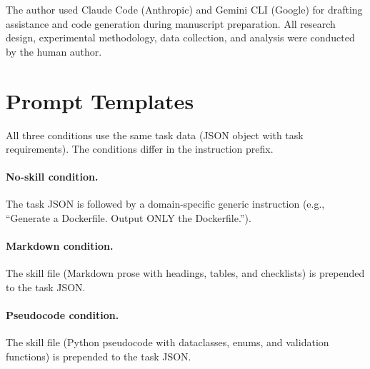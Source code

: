 \documentclass[sigconf,nonacm]{acmart}
\begin{document}

\begin{acks}
The author used Claude Code (Anthropic) and Gemini CLI (Google) for drafting
assistance and code generation during manuscript preparation. All research
design, experimental methodology, data collection, and analysis were conducted
by the human author.
\end{acks}








\appendix

\section{Prompt Templates}\label{app:prompts}

All three conditions use the same task data (JSON object with task
requirements). The conditions differ in the instruction prefix.

\paragraph{No-skill condition.}
The task JSON is followed by a domain-specific generic instruction
(e.g., ``Generate a Dockerfile. Output ONLY the Dockerfile.'').

\paragraph{Markdown condition.}
The skill file (Markdown prose with headings, tables, and checklists) is
prepended to the task JSON.

\paragraph{Pseudocode condition.}
The skill file (Python pseudocode with dataclasses, enums, and validation
functions) is prepended to the task JSON.
\end{document}

